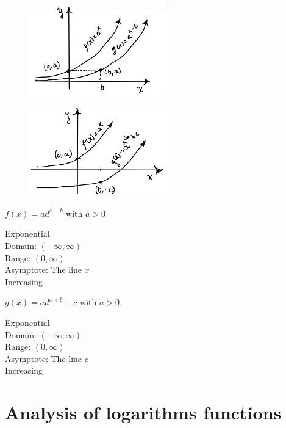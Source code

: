\begin{multicols}{2}
\begin{figure}[H]
    \end{figure}
    \begin{figure}[H]
        \centering
        \includegraphics[width=6cm]{images/fig5}
    \end{figure}
    \begin{figure}[H]
        \centering
        \includegraphics[width=6cm]{images/fig6}
    \end{figure}

    \begin{center}
        $f(x) = ad^{x - b}$ with $a > 0$

        Exponential\\
        Domain: $(-\infty, \infty)$\\
        Range: $(0, \infty)$\\
        Asymptote: The line $x$ \\
        Increasing
    \end{center}
    \hline
    \begin{center}
        $g(x) = ad^{x + b} + c$ with $a > 0$

        Exponential\\
        Domain: $(-\infty, \infty)$\\
        Range: $(0, \infty)$\\
        Asymptote: The line $c$ \\
        Increasing
    \end{center}
    \hline
\end{multicols}

\section{Analysis of logarithms functions}

